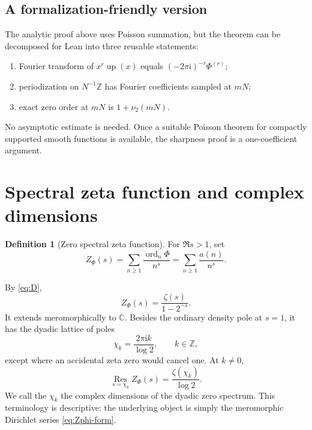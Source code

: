 \documentclass[11pt,oneside]{article}
\numberwithin{equation}{section}
\theoremstyle{definition}
\newtheorem{definition}[theorem]{Definition}
\theoremstyle{remark}
\newcommand{\C}{\mathbb C}
\newcommand{\Z}{\mathbb Z}
\newcommand{\ii}{\mathrm i}
\newcommand{\Up}{\operatorname{up}}
\newcommand{\ord}{\operatorname{ord}}
\newcommand{\Res}{\operatorname*{Res}}
\begin{document}
\subsection{A formalization-friendly version}

The analytic proof above uses Poisson summation, but the theorem can be decomposed
for Lean into three reusable statements:
\begin{enumerate}
\item Fourier transform of $x^r\Up(x)$ equals
      $(-2\pi\ii)^{-r}\Phi^{(r)}$;
\item periodization on $N^{-1}\Z$ has Fourier coefficients sampled at $mN$;
\item exact zero order at $mN$ is $1+\nu_2(mN)$.
\end{enumerate}
No asymptotic estimate is needed.  Once a suitable Poisson theorem for compactly
supported smooth functions is available, the sharpness proof is a one-coefficient
argument.

\section{Spectral zeta function and complex dimensions}
\label{sec:zeta}

\begin{definition}[Zero spectral zeta function]
For $\Re s>1$, set
\begin{equation}
 Z_\Phi(s)=\sum_{n\ge1}\frac{\ord_n\Phi}{n^s}
          =\sum_{n\ge1}\frac{a(n)}{n^s}.                  \label{eq:Zphi}
\end{equation}
\end{definition}
By \eqref{eq:D},
\begin{equation}
 Z_\Phi(s)=\frac{\zeta(s)}{1-2^{-s}}.                     \label{eq:Zphi-form}
\end{equation}
It extends meromorphically to $\C$.  Besides the ordinary density pole at $s=1$,
it has the dyadic lattice of poles
\begin{equation}
 \chi_k=\frac{2\pi\ii k}{\log2},\qquad k\in\Z,            \label{eq:chi}
\end{equation}
except where an accidental zeta zero would cancel one.  At $k\ne0$,
\begin{equation}
 \Res_{s=\chi_k}Z_\Phi(s)=\frac{\zeta(\chi_k)}{\log2}.    \label{eq:resZ}
\end{equation}
We call the $\chi_k$ the complex dimensions of the dyadic zero spectrum.  This
terminology is descriptive: the underlying object is simply the meromorphic
Dirichlet series \eqref{eq:Zphi-form}.
\end{document}
